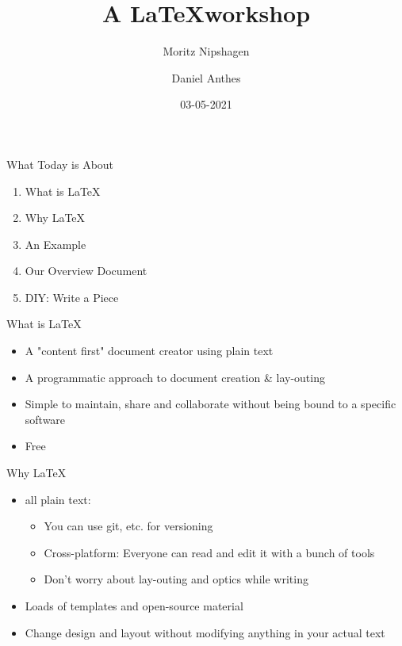 \documentclass[aspectratio=169]{beamer}
\title{A \LaTeX workshop}
\date{03-05-2021}
\author{Moritz Nipshagen \and Daniel Anthes}
\begin{document}
\begin{frame}
\titlepage
\end{frame}

\begin{frame}{What Today is About}
\begin{enumerate} 
\item<1-> What is \LaTeX
\item<2-> Why \LaTeX
\item<3-> An Example
\item<4-> Our Overview Document
\item<5-> DIY: Write a Piece
\end{enumerate}
\end{frame}

\begin{frame}{What is \LaTeX}
\begin{itemize}
\item A "content first" document creator using plain text
\item A programmatic approach to document creation \& lay-outing
\item Simple to maintain, share and collaborate without being bound to a specific software
\item Free
\end{itemize}
\end{frame}

\begin{frame}{Why \LaTeX}
    \begin{itemize}
        \item all plain text:
        \begin{itemize}
            \item You can use git, etc. for versioning
            \item Cross-platform: Everyone can read and edit it with a bunch of tools
            \item Don't worry about lay-outing and optics while writing
        \end{itemize}
        \item Loads of templates and open-source material
        \item Change design and layout without modifying anything in your actual text
    \end{itemize}
\end{frame}
\end{document}
